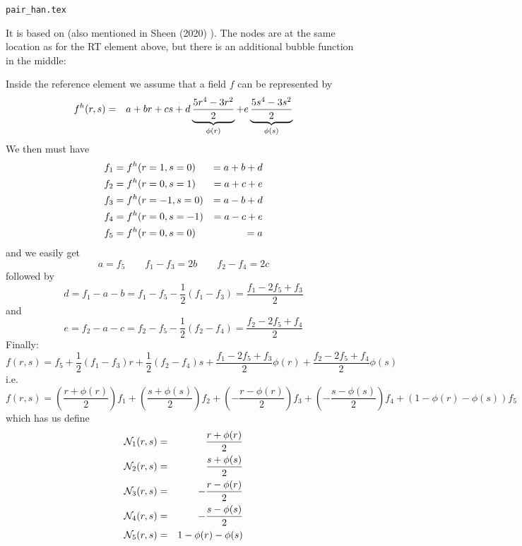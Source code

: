 \begin{flushright} {\tiny {\color{gray} \tt  pair\_han.tex}} \end{flushright}

It is based on \textcite{han84} (also mentioned in Sheen (2020) \cite{shee20}).
The nodes are at the same location as for the RT element above, but 
there is an additional bubble function in the middle:



Inside the reference element we assume that a field $f$
can be represented by 
\begin{eqnarray}
f^h(r,s) 
&=& a+ br +cs +d \underbrace{\frac{5r^4-3r^2}{2}}_{\phi(r)}
+e \underbrace{\frac{5s^4-3s^2}{2}}_{\phi(s)} \nonumber
\end{eqnarray}
We then must have 
\begin{align}
f_1 &= f^h(r=1,s=0) &= a+ b +d \nonumber\\
f_2 &= f^h(r=0,s=1) &= a+ c +e \nonumber\\
f_3 &= f^h(r=-1,s=0) &= a- b +d \nonumber\\
f_4 &= f^h(r=0,s=-1) &= a -c +e \nonumber\\
f_5 &= f^h(r=0,s=0) &= a  \nonumber
\end{align}
and we easily get 
\[
a = f_5 
\qquad
f_1-f_3 = 2b
\qquad 
f_2-f_4 = 2c
\]
followed by
\[
d=f_1-a-b = f_1 - f_5 - \frac{1}{2}(f_1-f_3) = \frac{f_1-2f_5+f_3}{2}
\]
and 
\[
e = f_2-a-c = f_2 - f_5 -  \frac{1}{2}(f_2-f_4) = \frac{f_2 -2f_5+f_4 }{2}
\]
Finally:
\[
f(r,s) = 
f_5 +
\frac{1}{2}(f_1-f_3) r+
\frac{1}{2}(f_2-f_4) s+
\frac{f_1-2f_5+f_3}{2} \phi(r)+
\frac{f_2 -2f_5+f_4 }{2} \phi(s)
\]
i.e.
\[
f(r,s) = 
\left(\frac{r + \phi(r)}{2} \right)f_1 +
\left(\frac{s+\phi(s)}{2} \right)f_2 +
\left(-\frac{r-\phi(r)}{2} \right)f_3 +
\left(-\frac{s - \phi(s)}{2} \right)f_4 +
\left(1-\phi(r)-\phi(s) \right)f_5 
\]
which has us define 
\begin{eqnarray}
{\mathcal{N}}_1(r,s) &=& \frac{r + \phi(r)}{2} \nonumber\\
{\mathcal{N}}_2(r,s) &=& \frac{s+\phi(s)}{2} \nonumber\\
{\mathcal{N}}_3(r,s) &=& -\frac{r-\phi(r)}{2} \nonumber\\
{\mathcal{N}}_4(r,s) &=& -\frac{s - \phi(s)}{2}\nonumber\\
{\mathcal{N}}_5(r,s) &=& 1-\phi(r)-\phi(s)\nonumber
\end{eqnarray}
